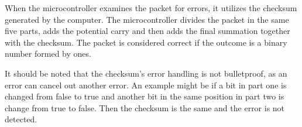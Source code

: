 When the microcontroller examines the packet for errors, it utilizes the checksum generated by the computer. The microcontroller divides the packet in the same five parts, adds the potential carry and then adds the final summation together with the checksum. The packet is considered correct if the outcome is a binary number formed by ones.

It should be noted that the checksum's error handling is not bulletproof, as an error can cancel out another error. An example might be if a bit in part one is changed from false to true and another bit in the same position in part two is change from true to false. Then the checksum is the same and the error is not detected. 

